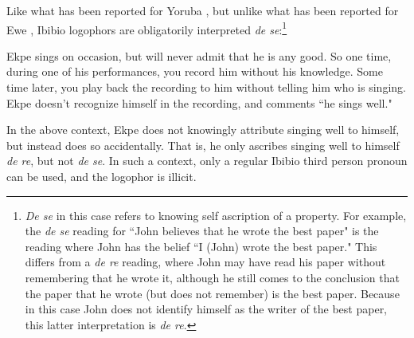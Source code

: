 \documentclass[output=paper]{langscibook}
\begin{document}
Like what has been reported for Yoruba \citep{Adesola2005,Anand2006}, but unlike what has been reported for Ewe \citep{Pearson2015}, Ibibio logophors are obligatorily interpreted \textit{de se}:\footnote{\textit{De se} in this case refers to knowing self ascription of a property. For example, the \textit{de se} reading for ``John believes that he wrote the best paper" is the reading where John has the belief ``I (John) wrote the best paper." This differs from a \textit{de re} reading, where John may have read his paper without remembering that he wrote it, although he still comes to the conclusion that the paper that he wrote (but does not remember) is the best paper. Because in this case John does not identify himself as the writer of the best paper, this latter interpretation is \textit{de re}.}
\begin{context}
		Ekpe sings on occasion, but will never admit that he is any good. So one time, during one of his performances, you record him without his knowledge. Some time later, you play back the recording to him without telling him who is singing. Ekpe doesn't recognize himself in the recording, and comments ``he sings well."
		\end{context}
		\begin{exe}
		
		\ex \begin{xlist}
	\end{xlist}
	\end{exe}
In the above context, Ekpe does not knowingly attribute singing well to himself, but instead does so accidentally. That is, he only ascribes singing well to himself \textit{de re}, but not \textit{de se}. In such a context, only a regular Ibibio third person pronoun can be used, and the logophor is illicit.
	
\end{document}
